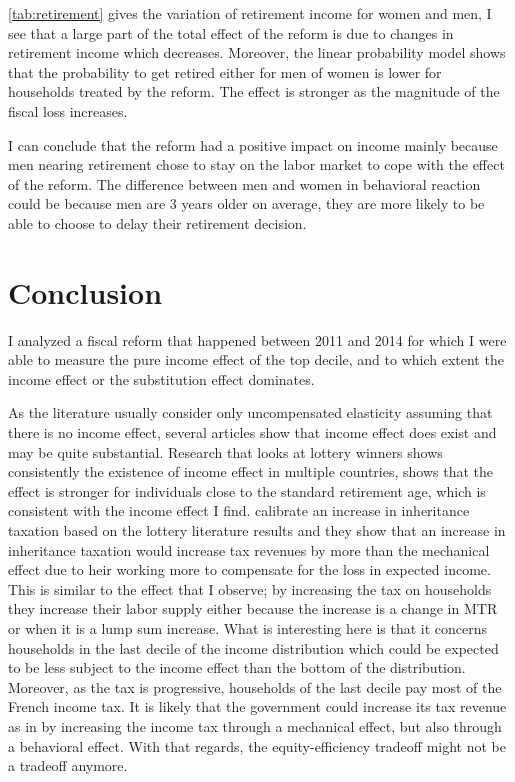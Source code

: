 \autoref{tab:retirement} gives the variation of retirement income for women and men, I see that a large part of the total effect of the reform is due to changes in retirement income which decreases. Moreover, the linear probability model shows that the probability to get retired either for men of women is lower for households treated by the reform. 
The effect is stronger as the magnitude of the fiscal loss increases. 

I can conclude that the reform had a positive impact on income mainly because men nearing retirement chose to stay on the labor market to cope with the effect of the reform. The difference between men and women in behavioral reaction could be because men are 3 years older on average, they are more likely to be able to choose to delay their retirement decision.
 
\section{Conclusion}
I analyzed a fiscal reform that happened between 2011 and 2014 for which I were able to measure the pure income effect of the top decile, and to which extent the income effect or the substitution effect dominates.

As the literature usually consider only uncompensated elasticity assuming that there is no income effect, several articles show that income effect does exist and may be quite substantial. Research that looks at lottery winners shows consistently the existence of income effect in multiple countries, \citet{Imbens_2001} shows that the effect is stronger for individuals close to the standard retirement age, which is consistent with the income effect I find. 
\citet{kindermann2018inheritance} calibrate an increase in inheritance taxation based on the lottery literature results and they show that an increase in inheritance taxation would increase tax revenues by more than the mechanical effect due to heir working more to compensate for the loss in expected income.
This is similar to the effect that I observe; by increasing the tax on households they increase their labor supply either because the increase is a change in MTR or when it is a lump sum increase. What is interesting here is that it concerns households in the last decile of the income distribution which could be expected to be less subject to the income effect than the bottom of the distribution. Moreover,  as the tax is progressive, households of the last decile pay most of the French income tax. It is likely that the government could increase its tax revenue as in \citet{kindermann2018inheritance} by increasing the income tax through a mechanical effect, but also through a behavioral effect. With that regards, the equity-efficiency tradeoff might not be a tradeoff anymore.

